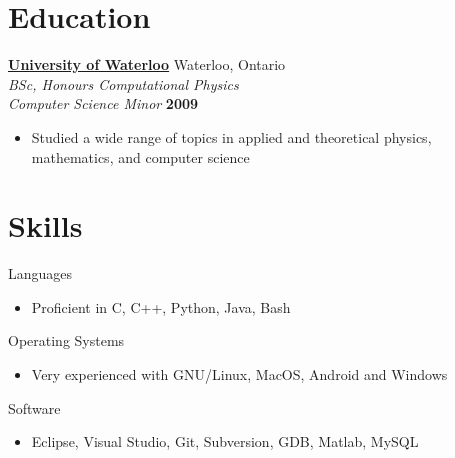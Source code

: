 \documentclass[margin,line]{res}
\begin{document}
\begin{resume}
  \section{\sc Education}
      \href{http://www.uwaterloo.ca}{\bf University of Waterloo} {\hfill Waterloo, Ontario}\\
      {\em BSc, Honours Computational Physics \\ Computer Science Minor} \hfill {\bf 2009}
      \begin{itemize} \itemsep -2pt
        \item Studied a wide range of topics in applied and theoretical physics, mathematics, and computer science
      \end{itemize}

    \section{\sc Skills} 

      {Languages}
      \begin{itemize} \itemsep -2pt
        \item Proficient in C, C++, Python, Java, Bash
      \end{itemize}
      
      \vspace{-.3cm}
      
      {Operating Systems}
      \begin{itemize} \itemsep -2pt
        \item Very experienced with GNU/Linux, MacOS, Android and Windows
      \end{itemize}
      
      \vspace{-.3cm}

      {Software}
      \begin{itemize} \itemsep -2pt
        \item Eclipse, Visual Studio, Git, Subversion, GDB, Matlab, MySQL
      \end{itemize}



\end{resume}
\end{document}
